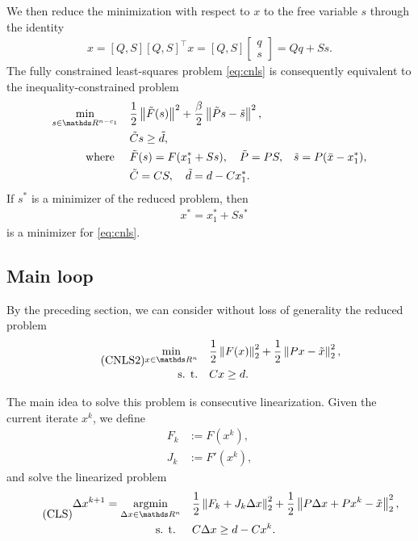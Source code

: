 \documentclass{article}
\numberwithin{equation}{section}
\theoremstyle{nonumberplain}
\newcommand{\funk}{ F_k }
\newcommand{\jack}{ J_k }
\begin{document}
We then reduce the minimization with respect to $x$ to the free variable $s$ through the identity
\begin{align*}
x = [Q, S] [Q, S]^\top x = [Q, S] \begin{bmatrix}
q \\ s
\end{bmatrix} = Q q + S s.
\end{align*}
The fully constrained least-squares problem \eqref{eq:cnls} is consequently equivalent to the inequality-constrained problem
\begin{equation}
\begin{aligned}
\min_{s \in \R^{n-c_1}} \quad & \frac{1}{2} \norm{\tilde F(s)}^2 + \frac{\beta}{2} \norm{\tilde P s - \tilde s}^2, \\
& \tilde C s \geq \tilde d,\\
\text{where } \quad & \tilde F(s)=F(x_1^* + S s), \quad \tilde P = P S, &  \tilde s = P(\bar x - x_1^*), \\
& \tilde C = C S, \quad \tilde d = d - C x_1^*. \\
\end{aligned}
\end{equation}
If $s^*$ is a minimizer of the reduced problem, then
\begin{align*}
& x^* = x_1^* + S s^*
\end{align*}
is a minimizer for \eqref{eq:cnls}.

\subsection{Main loop}

By the preceding section, we can consider without loss of generality the reduced problem
\begin{equation}\tag{CNLS2}\label{eq:cnls2}
\begin{aligned}
\min_{x \in \R^n} \quad & \frac{1}{2}\norm{F(x)}_2^2 + \frac{1}{2} \norm{P x - \tilde x}_2^2,\\
\text{s. t.} \quad & C x \geq d.
\end{aligned}
\end{equation}

The main idea to solve this problem is consecutive linearization. Given the current iterate $x^k$, we define
\begin{align*}
\funk & := F(x^k), \\
\jack & := F'(x^k),
\end{align*}
and solve the linearized problem
\begin{equation}\tag{CLS}\label{eq:cls}
\begin{aligned}
\Delta x^{k+1} = \argmin_{\Delta x \in \R^n} \quad & \frac{1}{2}\norm{\funk + \jack \Delta x}_2^2 + \frac{1}{2} \norm{P \Delta x + P x^k - \tilde x}_2^2,\\
\text{s. t. } \quad & C \Delta x \geq d - C x^k.
\end{aligned}
\end{equation}
\end{document}

